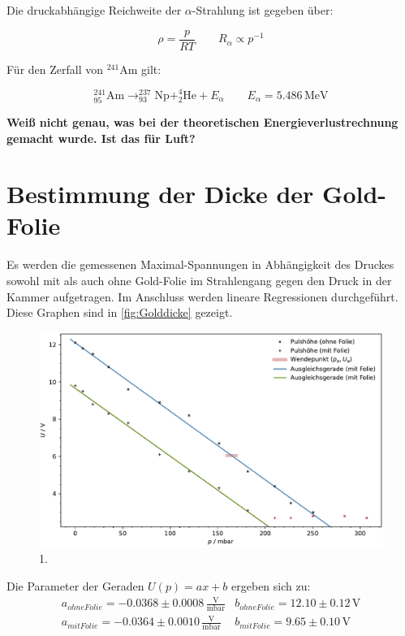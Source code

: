 Die druckabhängige Reichweite der $\alpha$-Strahlung ist gegeben über:


\[ \rho = \frac{p}{RT} \qquad R_\alpha \propto p^{-1} \]



Für den Zerfall von $^{241}\text{Am}$ gilt:


\[ ^{241}_{95}\text{Am} \rightarrow ^{237}_{93}\text{Np} + ^4_2\text{He} + E_\alpha \qquad E_\alpha = 5.486 \, \text{MeV} \]



\textbf{Weiß nicht genau, was bei der theoretischen Energieverlustrechnung gemacht wurde. Ist das für Luft?}

\section*{Bestimmung der Dicke der Gold-Folie}

Es werden die gemessenen Maximal-Spannungen in Abhängigkeit des Druckes sowohl mit als auch ohne Gold-Folie im Strahlengang gegen den Druck in der Kammer aufgetragen.
Im Anschluss werden lineare Regressionen durchgeführt. Diese Graphen sind in \autoref{fig:Golddicke} gezeigt.
\begin{figure}
    \centering
    \includegraphics[width=1\textwidth]{content/messung/Golddicke.pdf}
    \caption{1.}
    \label{fig:Golddicke}
\end{figure}
Die Parameter der Geraden $U(p)= ax+b$ ergeben sich zu:
\begin{align*}
    a_{ohne Folie} = -0.0368 \pm 0.0008 \, \frac{\text{V}}{\text{mbar}} & b_{ohne Folie} = 12.10 \pm 0.12 \, \text{V} \\
    a_{mit Folie} = -0.0364 \pm 0.0010 \, \frac{\text{V}}{\text{mbar}} & b_{mit Folie} = 9.65 \pm 0.10 \, \text{V}
\end{align*}


